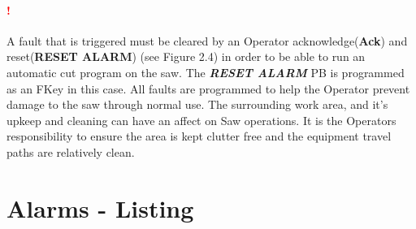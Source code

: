 \paragraph*{\textbf{{\LARGE \textcolor{red}{!}}}}A fault that is triggered must be cleared by an Operator acknowledge(\textbf{Ack}) and reset(\textbf{RESET ALARM}) (see Figure 2.4) in order to be able to run an automatic cut program on the saw. The \textbf{\textit{RESET ALARM}} PB is programmed as an FKey in this case. All faults are programmed to help the Operator prevent damage to the saw through normal use. The surrounding work area, and it's upkeep and cleaning can have an affect on Saw operations. It is the Operators responsibility to ensure the area is kept clutter free and the equipment travel paths are relatively clean.
\section{Alarms - Listing}
